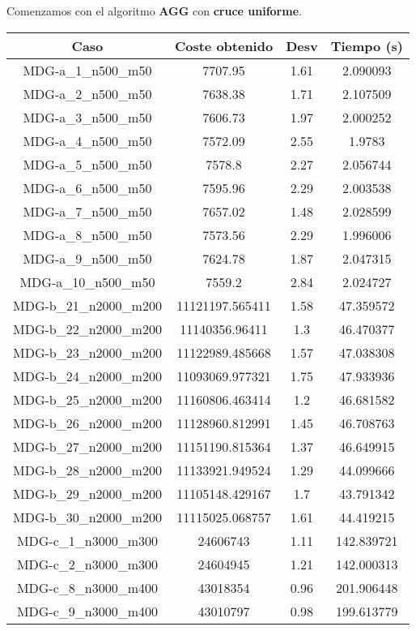 \documentclass{article}
\begin{document}
Comenzamos con el algoritmo \textbf{AGG} con \textbf{cruce uniforme}.

\begin{table}[H]
	\centering
	\begin{tabular}{|cccc|}
		\hline
		Caso & Coste obtenido & Desv & Tiempo (s)\\ \hline
		MDG-a\_1\_n500\_m50 & 7707.95 & 1.61 & 2.090093\\
		MDG-a\_2\_n500\_m50 & 7638.38 & 1.71 & 2.107509\\
		MDG-a\_3\_n500\_m50 & 7606.73 & 1.97 & 2.000252\\
		MDG-a\_4\_n500\_m50 & 7572.09 & 2.55 & 1.9783\\
		MDG-a\_5\_n500\_m50 & 7578.8 & 2.27 & 2.056744\\
		MDG-a\_6\_n500\_m50 & 7595.96 & 2.29 & 2.003538\\
		MDG-a\_7\_n500\_m50 & 7657.02 & 1.48 & 2.028599\\
		MDG-a\_8\_n500\_m50 & 7573.56 & 2.29 & 1.996006\\
		MDG-a\_9\_n500\_m50 & 7624.78 & 1.87 & 2.047315\\
		MDG-a\_10\_n500\_m50 & 7559.2 & 2.84 & 2.024727\\
		MDG-b\_21\_n2000\_m200 & 11121197.565411 & 1.58 & 47.359572\\
		MDG-b\_22\_n2000\_m200 & 11140356.96411 & 1.3 & 46.470377\\
		MDG-b\_23\_n2000\_m200 & 11122989.485668 & 1.57 & 47.038308\\
		MDG-b\_24\_n2000\_m200 & 11093069.977321 & 1.75 & 47.933936\\
		MDG-b\_25\_n2000\_m200 & 11160806.463414 & 1.2 & 46.681582\\
		MDG-b\_26\_n2000\_m200 & 11128960.812991 & 1.45 & 46.708763\\
		MDG-b\_27\_n2000\_m200 & 11151190.815364 & 1.37 & 46.649915\\
		MDG-b\_28\_n2000\_m200 & 11133921.949524 & 1.29 & 44.099666\\
		MDG-b\_29\_n2000\_m200 & 11105148.429167 & 1.7 & 43.791342\\
		MDG-b\_30\_n2000\_m200 & 11115025.068757 & 1.61 & 44.419215\\
		MDG-c\_1\_n3000\_m300 & 24606743 & 1.11 & 142.839721\\
		MDG-c\_2\_n3000\_m300 & 24604945 & 1.21 & 142.000313\\
		MDG-c\_8\_n3000\_m400 & 43018354 & 0.96 & 201.906448\\
		MDG-c\_9\_n3000\_m400 & 43010797 & 0.98 & 199.613779\\

\end{tabular}
\end{table}
\end{document}
